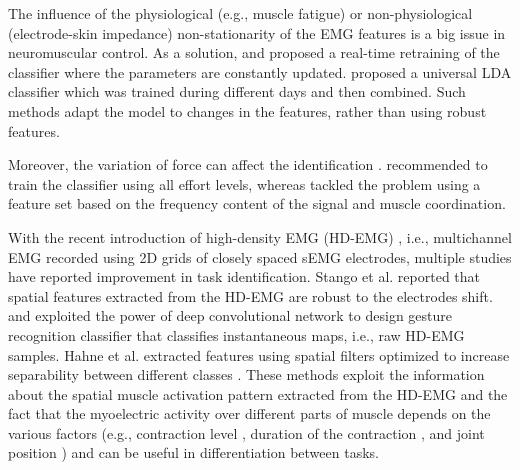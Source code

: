 The influence of the physiological (e.g., muscle fatigue) or non-physiological (electrode-skin impedance) non-stationarity of the EMG features is a big issue in neuromuscular control. As a solution, \citep{Vidovic2016} and \citep{Hahne2015} proposed a real-time retraining of the classifier where the parameters are constantly updated. \citet{Liu2016} proposed a universal LDA classifier which was trained during different days and then combined. Such methods adapt the model to changes in the features, rather than using robust features.

Moreover, the variation of force can affect the identification \citep{Tkach2010}. \citep{Scheme2013} recommended to train the classifier using all effort levels, whereas \citep{He2015} tackled the problem using a feature set based on the frequency content of the signal and muscle coordination.

With the recent introduction of high-density EMG (HD-EMG) \citep{Merletti2009}, i.e., multichannel EMG recorded using 2D grids of closely spaced sEMG electrodes, multiple studies have reported improvement in task identification. Stango et al. reported that spatial features extracted from the HD-EMG are robust to the electrodes shift. \citep{Geng2016} and \citep{Du2017} exploited the power of deep convolutional network to design gesture recognition classifier that classifies instantaneous maps, i.e., raw HD-EMG samples. Hahne et al. extracted features using spatial filters optimized to increase separability between different classes \citep{Hahne2012}. These methods exploit the information about the spatial muscle activation pattern extracted from the HD-EMG and the fact that the myoelectric activity over different parts of muscle depends on the various factors (e.g., contraction level \citep{Holtermann2005}, duration of the contraction \citep{Tucker2009}, and joint position \citep{Vieira2010}) and can be useful in differentiation between tasks.

